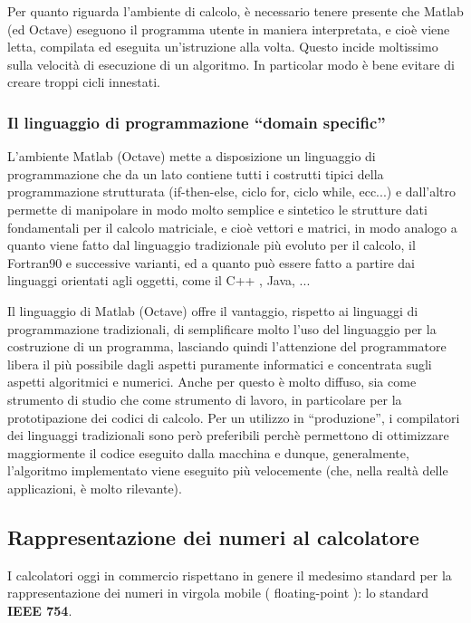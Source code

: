 Per quanto riguarda l'ambiente di calcolo, è necessario tenere presente che Matlab (ed Octave) eseguono il programma utente in maniera interpretata, e cioè viene letta, compilata ed eseguita un’istruzione alla volta. Questo incide moltissimo sulla velocità di esecuzione di un algoritmo. In particolar modo è bene evitare di creare troppi cicli innestati.

\subsubsection{Il linguaggio di programmazione ``domain specific''}

L’ambiente Matlab (Octave) mette a disposizione un linguaggio di programmazione che da un lato contiene tutti i costrutti tipici della programmazione strutturata (if-then-else, ciclo for, ciclo while, ecc...) e dall’altro permette di manipolare in modo molto semplice e sintetico le strutture dati fondamentali per il calcolo matriciale, e cioè vettori e matrici, in modo analogo a quanto viene fatto dal linguaggio tradizionale più evoluto per il calcolo, il Fortran90 e successive varianti, ed a quanto può essere fatto a partire dai linguaggi orientati agli oggetti, come il C++ , Java, ...

Il linguaggio di Matlab (Octave) offre il vantaggio, rispetto ai linguaggi di programmazione tradizionali, di semplificare molto l’uso del linguaggio per la costruzione di un programma, lasciando quindi l’attenzione del programmatore libera il più possibile dagli aspetti puramente informatici e concentrata sugli aspetti algoritmici e numerici. Anche per questo è molto diffuso, sia come strumento di studio che come strumento di lavoro, in particolare per la prototipazione dei codici di calcolo. Per un utilizzo in ``produzione'', i compilatori dei linguaggi tradizionali sono però preferibili perchè permettono di ottimizzare maggiormente il codice eseguito dalla macchina e dunque, generalmente, l’algoritmo implementato viene eseguito più velocemente (che, nella realtà delle applicazioni, è molto rilevante).


\subsection{Rappresentazione dei numeri al calcolatore}

I calcolatori oggi in commercio rispettano in genere il medesimo standard per la rappresentazione dei numeri in virgola mobile ( floating-point ): lo standard \textbf{IEEE 754}.

